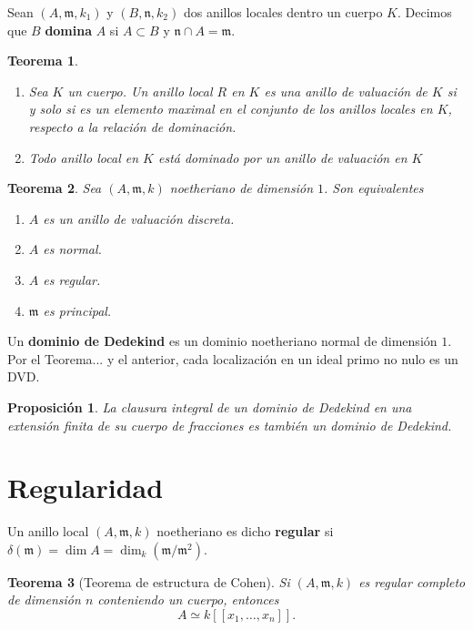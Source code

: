 \documentclass[12pt]{book}
\newtheorem{teo}{Teorema}
\newtheorem{pro}{Proposición}
\begin{document}
Sean $(A, \mathfrak{m}, k_1)$ y $(B, \mathfrak{n}, k_2)$ dos anillos locales dentro un cuerpo $K$. Decimos que $B$ \textbf{domina} $A$ si $ A \subset B $ y $ \mathfrak{n} \cap A = \mathfrak{m}$.

\begin{teo}
	\begin{enumerate}
		\item Sea $K$ un cuerpo. Un anillo local $R$ en $K$ es una anillo de valuación de  $K$ si y solo si es un elemento maximal en el conjunto de los anillos locales en $K$, respecto a la relación de dominación. 
		\item Todo anillo local en $K$ está dominado por un anillo de valuación en $K$
	\end{enumerate}
\end{teo}


\begin{teo}
	Sea $(A, \mathfrak{m}, k)$ noetheriano de dimensión $1$. Son equivalentes
	\begin{enumerate}
		\item $A$ es un anillo de valuación discreta.
		\item $A$ es normal.
		\item $A$ es regular.
		\item $\mathfrak{m}$ es principal.
	\end{enumerate}
\end{teo}

Un \textbf{dominio de Dedekind} es un dominio noetheriano normal de dimensión $1$. Por el Teorema... y el anterior, cada localización en un ideal primo no nulo es un DVD. 

\begin{pro}
	La clausura integral de un dominio de Dedekind en una extensión finita de su cuerpo de fracciones es también un dominio de Dedekind.
\end{pro}




\section{Regularidad}
Un anillo local $(A, \mathfrak{m},k)$ noetheriano es dicho \textbf{regular} si $\delta(\mathfrak{m}) = \dim A = \dim _k (\mathfrak{m} / \mathfrak{m}^2)$.\\


\begin{teo}[Teorema de estructura de Cohen]
	Si $(A, \mathfrak{m}, k)$ es regular completo de dimensión $n$ conteniendo un cuerpo, entonces $$A \simeq k[[x_1, \ldots , x_n]].$$
\end{teo}
\end{document}
